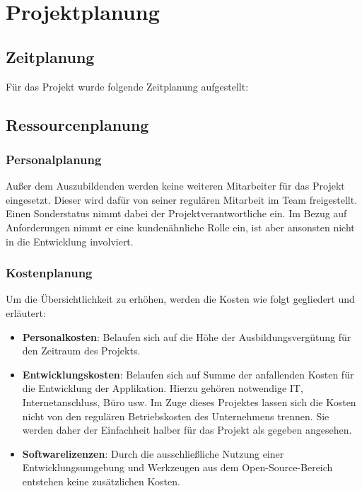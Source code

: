 \section{Projektplanung}
\label{sec:Projektplanung}

\subsection{Zeitplanung}
\label{sec:Zeitplanung}
Für das Projekt wurde folgende Zeitplanung aufgestellt:


\subsection{Ressourcenplanung}
\label{sec:Ressourcenplanung}
\subsubsection{Personalplanung}
\label{sec:Personalplanung}
Außer dem Auszubildenden werden keine weiteren Mitarbeiter für das Projekt eingesetzt. Dieser wird
dafür von seiner regulären Mitarbeit im Team freigestellt. Einen Sonderstatus nimmt dabei der
Projektverantwortliche ein. Im Bezug auf Anforderungen nimmt er eine kundenähnliche Rolle ein,
ist aber ansonsten nicht in die Entwicklung involviert.
\pagebreak
\subsubsection{Kostenplanung}
\label{sec:Kostenplanung}
Um die Übersichtlichkeit zu erhöhen, werden die Kosten wie folgt gegliedert und erläutert:
\begin{itemize}
	\item \textbf{Personalkosten}: Belaufen sich auf die Höhe der Ausbildungsvergütung für den Zeitraum des Projekts.
	\item \textbf{Entwicklungskosten}: Belaufen sich auf Summe der anfallenden Kosten für die Entwicklung der Applikation.
	Hierzu gehören notwendige IT, Internetanschluss, Büro usw. Im Zuge dieses Projektes lassen sich die Kosten nicht
	von den regulären Betriebskosten des Unternehmens trennen. Sie werden daher der Einfachheit halber für das Projekt als gegeben
	angesehen.
	\item \textbf{Softwarelizenzen}: Durch die ausschließliche Nutzung einer Entwicklungsumgebung und Werkzeugen aus dem
	Open-Source-Bereich entstehen keine zusätzlichen Kosten.
\end{itemize}

